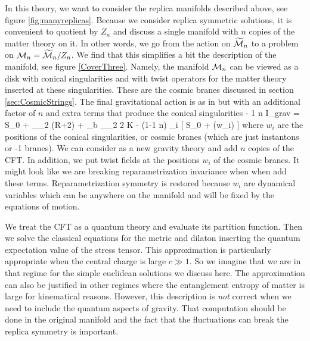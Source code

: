  In this theory,  we want to consider the replica manifolds described above, see figure \ref{fig:manyreplicas}. Because we consider replica symmetric solutions, it is convenient to quotient by $Z_n$ and discuss a single manifold with $n$ copies of the matter theory on it. 
 In other words, we go from the action  on $\widetilde {\cal M}_n$ to a problem 
 on ${\cal M}_n = \widetilde {\cal M}_n/Z_n $. We find that this simplifies a bit the description of the manifold, see figure \ref{CoverThree}. Namely, the manifold ${\cal M}_n$  can be viewed as a disk with conical singularities and with twist operators for the matter theory inserted at these singularities. These are the cosmic branes discussed in section \ref{sec:CosmicStrings}. The final gravitational action is as in   but 
  with an additional factor of $n$ and extra terms that produce the conical singularities 
  \be {}
  -{ 1 \over n} I_{\rm grav} =  
{  S_0  \pi }   +  \int_{\Sigma_2} { \phi {} \pi} (R+2) +  { \phi_b  \pi}  \int_{\partial \Sigma_2} 2 K  -  (1-{1 \over n}) \sum_i [ S_0 + \phi(w_i) ]
\ee
where $w_i$ are the positions of the conical singularities, or cosmic branes (which are just instantons  or -1 branes). 
We can consider  as a new gravity theory and add $n$ copies of the CFT. In addition, 
we put twist fields at the positions $w_i$ of the cosmic branes.  It might look like we are breaking reparametrization invariance when when add these terms.  Reparametrization symmetry is restored because $w_i$ are dynamical variables which can be anywhere on the manifold and will be fixed by the equations of motion. 


 We treat the CFT as a quantum theory and evaluate its partition function. Then we solve the classical equations for the metric and dilaton inserting the quantum expectation value of the stress tensor. This approximation is particularly appropriate when the central charge is large $c\gg 1$. 
 So we imagine that we are in that regime for the simple euclidean solutions we discuss here. The approximation can also be justified in other regimes where  the entanglement entropy of matter is large for kinematical reasons.  
 However, this description is {\it not} correct when we need to include the quantum aspects of gravity. That computation should be done in the original manifold and the fact that the fluctuations can break the replica symmetry is important. 
 
